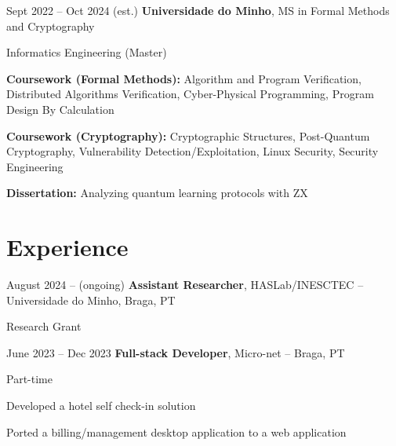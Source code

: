 \documentclass[10pt, letterpaper]{article}
\begin{document}
        \begin{twocolentry}{
            Sept 2022 – Oct 2024 (est.)
        }
            \textbf{Universidade do Minho}, MS in Formal Methods and Cryptography\end{twocolentry}
        Informatics Engineering (Master)
        \vspace{0.10 cm}
        \begin{onecolentry}
            \begin{highlights}
                \item \textbf{Coursework (Formal Methods):} Algorithm and Program Verification, Distributed Algorithms Verification, Cyber-Physical Programming, Program Design By Calculation
                \item \textbf{Coursework (Cryptography):} Cryptographic Structures, Post-Quantum Cryptography, Vulnerability Detection/Exploitation, Linux Security, Security Engineering
                \item \textbf{Dissertation:} Analyzing quantum learning protocols with ZX
                
                
            \end{highlights}
        \end{onecolentry}



    
    \section{Experience}


        \begin{twocolentry}{
            August 2024 – (ongoing)
        }
            \textbf{Assistant Researcher}, HASLab/INESCTEC -- Universidade do Minho, Braga, PT\end{twocolentry}
        Research Grant

        \vspace{0.10 cm}
        \vspace{0.2 cm}

        \begin{twocolentry}{
            June 2023 – Dec 2023
        }
            \textbf{Full-stack Developer}, Micro-net -- Braga, PT\end{twocolentry}
        Part-time
        \vspace{0.10 cm}
        \begin{onecolentry}
            \begin{highlights}
                \item Developed a hotel self check-in solution
                \item Ported a billing/management desktop application to a web application 
            \end{highlights}
        \end{onecolentry}
\end{document}
